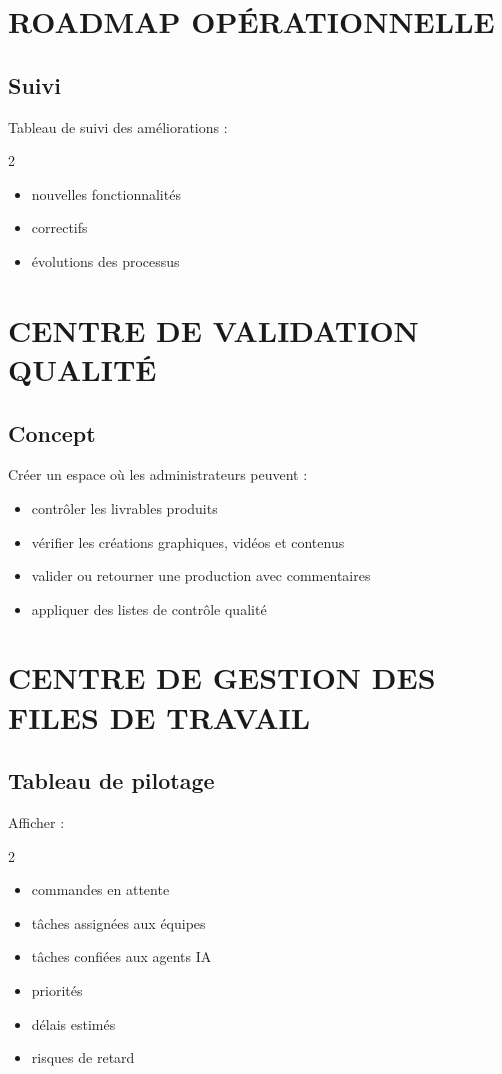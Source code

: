 \documentclass[12pt,a4paper,oneside]{book}
\begin{document}
\chapter{ROADMAP OPÉRATIONNELLE}

\section{Suivi}
Tableau de suivi des améliorations :
\begin{multicols}{2}
\begin{itemize}
\item nouvelles fonctionnalités
\item correctifs
\item évolutions des processus
\end{itemize}
\end{multicols}

\chapter{CENTRE DE VALIDATION QUALITÉ}

\section{Concept}
Créer un espace où les administrateurs peuvent :
\begin{itemize}
\item contrôler les livrables produits
\item vérifier les créations graphiques, vidéos et contenus
\item valider ou retourner une production avec commentaires
\item appliquer des listes de contrôle qualité
\end{itemize}

\chapter{CENTRE DE GESTION DES FILES DE TRAVAIL}

\section{Tableau de pilotage}
Afficher :
\begin{multicols}{2}
\begin{itemize}
\item commandes en attente
\item tâches assignées aux équipes
\item tâches confiées aux agents IA
\item priorités
\item délais estimés
\item risques de retard
\end{itemize}
\end{multicols}
\end{document}
